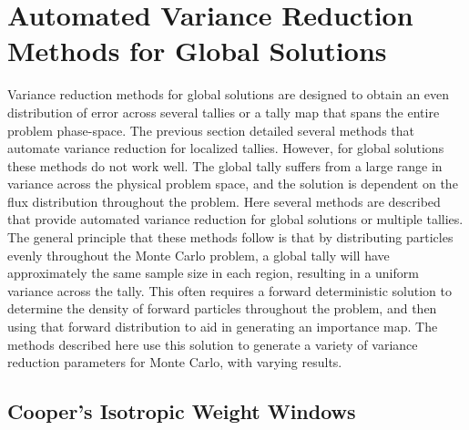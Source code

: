 \section{Automated Variance Reduction Methods for Global Solutions}
\label{sec:GlobalVR}

Variance reduction methods for global solutions are designed to obtain an even
distribution of error across several tallies or a tally map that spans the
entire problem phase-space.
The previous section detailed several methods that automate variance reduction
for localized tallies. However, for global solutions these methods do not work
well. The global tally suffers from a large range in variance across the
physical problem space, and the solution is dependent on the flux distribution
throughout the problem. Here several methods are described that provide
automated variance reduction for global solutions or multiple tallies. The
general principle that these methods follow is that by distributing particles
evenly throughout the Monte Carlo problem, a global tally will have
approximately the same sample size in each region, resulting in a uniform
variance across the tally. This often requires a forward deterministic solution
to determine the density of forward particles throughout the problem, and then
using that forward distribution to aid in generating an importance map. The
methods described here use this solution to generate a variety of variance
reduction parameters for Monte Carlo, with varying results.

\subsection{Cooper's Isotropic Weight Windows}
\label{subsec:CooperGlobal}

